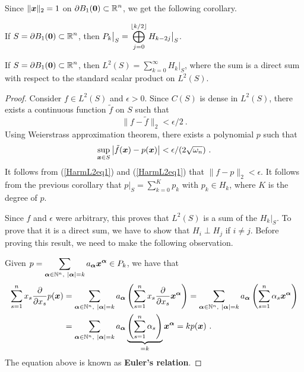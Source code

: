 Since $\|\VEC{x}\|_2 = 1$ on
$\displaystyle \partial B_1(\VEC{0}) \subset \RR^n$, we
get the following corollary.

\begin{cor}
If $\displaystyle S = \partial B_1(\VEC{0}) \subset \RR^n$, then
$\displaystyle P_k\big|_S = \bigoplus_{j=0}^{\intpt{k/2}} H_{k-2j}\big|_S$.
\end{cor}

\begin{theorem} \label{L2DecHk}
If $\displaystyle S = \partial B_1(\VEC{0}) \subset \RR^n$, then
$\displaystyle L^2(S) = \sum_{k=0}^\infty H_k\big|_S$, where the sum
is a direct sum with respect to the standard scalar product on
$\displaystyle L^2(S)$.
\end{theorem}

\begin{proof}
Consider $\displaystyle f \in L^2(S)$ and $\epsilon >0$.  Since $C(S)$
is dense in $\displaystyle L^2(S)$, there exists a continuous function
$\tilde{f}$ on $S$ such that
\begin{equation} \label{HarmL2eq1}
  \|f - \tilde{f}\|_2 < \epsilon/2 \ .
\end{equation}
Using Weierstrass approximation theorem, there exists a polynomial $p$
such that
\begin{equation} \label{HarmL2eq2}
\sup_{\VEC{x} \in S} \big|\tilde{f}(\VEC{x}) - p(\VEC{x})\big|
< \epsilon/(2\sqrt{\omega_n}) \ .
\end{equation}
It follows from (\ref{HarmL2eq1}) and (\ref{HarmL2eq1}) that
$\|f - p \|_2 < \epsilon$.
It follows from the previous corollary that
$\displaystyle p\big|_S = \sum_{k=0}^K p_k$ with
$p_k \in H_k$, where $K$ is the degree of $p$.

Since $f$ and $\epsilon$ were arbitrary, this proves that
$\displaystyle L^2(S)$ is a sum of the $H_k\big|_S$.  To prove that it
is a direct sum, we have to show that $H_i \perp H_j$ if $i \neq j$.  Before
proving this result, we need to make the following observation.

Given $\displaystyle p = \sum_{\VEC{\alpha} \in \NN^n,\ |\VEC{\alpha}| = k}
a_{\VEC{\alpha}} \VEC{x}^{\VEC{\alpha}} \in P_k$, we have that
\begin{align*}
\sum_{s=1}^n x_s \pdfdx{p}{x_s}(\VEC{x})
& = \sum_{\VEC{\alpha} \in \NN^n,\ |\VEC{\alpha}| = k} a_{\VEC{\alpha}}
\left( \sum_{s=1}^n x_s \pdydx{}{x_s} \VEC{x}^{\VEC{\alpha}} \right)
 =  \sum_{\VEC{\alpha} \in \NN^n,\ |\VEC{\alpha}| = k} a_{\VEC{\alpha}}
\left( \sum_{s=1}^n \alpha_s \VEC{x}^{\VEC{\alpha}} \right) \\
&=  \sum_{\VEC{\alpha} \in \NN^n,\ |\VEC{\alpha}| = k} a_{\VEC{\alpha}}
\underbrace{\left( \sum_{s=1}^n \alpha_s\right)}_{=k} \VEC{x}^{\VEC{\alpha}}
= k p(\VEC{x}) \ .
\end{align*}
The equation above is known as {\bfseries Euler's relation}.


\end{proof}
